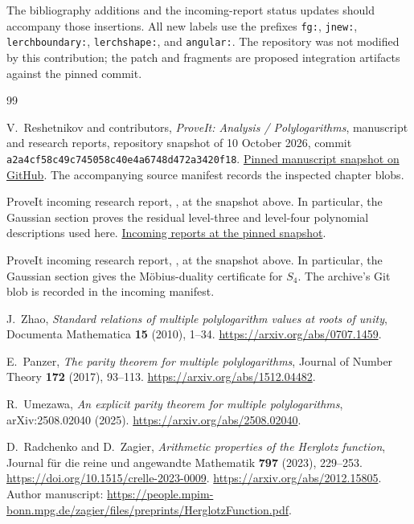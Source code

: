 \documentclass[11pt,a4paper]{article}
\theoremstyle{definition}
\theoremstyle{remark}
\numberwithin{equation}{section}
\begin{document}
The bibliography additions and the incoming-report status updates
should accompany those insertions. All new labels use the prefixes
\texttt{fg:}, \texttt{jnew:}, \texttt{lerchboundary:}, \texttt{lerchshape:}, and
\texttt{angular:}. The repository was not modified by this contribution;
the patch and fragments are proposed integration artifacts against the
pinned commit.
\begin{thebibliography}{99}
\raggedright
{}

V.~Reshetnikov and contributors, \emph{ProveIt: Analysis / Polylogarithms},
manuscript and research reports, repository snapshot of 10 October 2026,
commit \texttt{a2a4cf58c49c745058c40e4a6748d472a3420f18}.
\href{https://github.com/VladimirReshetnikov/ProveIt/tree/a2a4cf58c49c745058c40e4a6748d472a3420f18/Analysis/Polylogarithms/docs/manuscript}{Pinned manuscript snapshot on GitHub}.
The accompanying source manifest records the inspected chapter blobs.

ProveIt incoming research report,
, at the snapshot above.
In particular, the Gaussian section proves the residual level-three
and level-four polynomial descriptions used here.
\href{https://github.com/VladimirReshetnikov/ProveIt/tree/a2a4cf58c49c745058c40e4a6748d472a3420f18/Analysis/Polylogarithms/docs/incoming}{Incoming reports at the pinned snapshot}.

ProveIt incoming research report,
, at the snapshot above.
In particular, the Gaussian section gives the Möbius-duality certificate
for $S_4$. The archive's Git blob is recorded in the incoming manifest.

J.~Zhao, \emph{Standard relations of multiple polylogarithm values at
roots of unity}, Documenta Mathematica \textbf{15} (2010), 1--34.
\url{https://arxiv.org/abs/0707.1459}.

E.~Panzer, \emph{The parity theorem for multiple polylogarithms},
Journal of Number Theory \textbf{172} (2017), 93--113.
\url{https://arxiv.org/abs/1512.04482}.

R.~Umezawa, \emph{An explicit parity theorem for multiple polylogarithms},
arXiv:2508.02040 (2025).
\url{https://arxiv.org/abs/2508.02040}.

D.~Radchenko and D.~Zagier,
\emph{Arithmetic properties of the Herglotz function},
Journal für die reine und angewandte Mathematik \textbf{797} (2023),
229--253.
\url{https://doi.org/10.1515/crelle-2023-0009}.
\url{https://arxiv.org/abs/2012.15805}.
Author manuscript:
\url{https://people.mpim-bonn.mpg.de/zagier/files/preprints/HerglotzFunction.pdf}.


\end{thebibliography}
\end{document}
